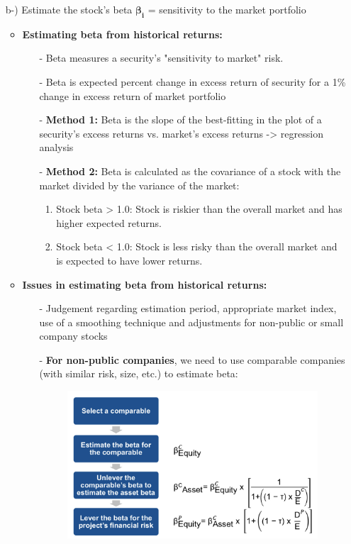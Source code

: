 \documentclass[ieeetran]{article}
\begin{document}
\begin{itemize}
\begin{itemize}
\begin{itemize}
			\item[b-)] Estimate the stock's beta $\boldsymbol{\beta_i}$ = sensitivity to the market portfolio
				\begin{itemize}
					\item \textbf{Estimating beta from historical returns:}
						\begin{enumerate}
							\item[-] Beta measures a security's "sensitivity to market" risk.
							\item[-] Beta is expected percent change in excess return of security for a 1\% change in excess return of market portfolio
							\item[-] \textbf{Method 1:} Beta is the slope of the best-fitting in the plot of a security's excess returns vs. market's excess returns -> regression analysis
							\item[-] \textbf{Method 2:} Beta is calculated as the covariance of a stock with the market divided by the variance of the market:
								\begin{enumerate}
									\item Stock beta > 1.0: Stock is riskier than the overall market and has higher expected returns.
									\item Stock beta < 1.0: Stock is less risky than the overall market and is expected to have lower returns.
								\end{enumerate}
						\end{enumerate}

					\item \textbf{Issues in estimating beta from historical returns:}
						\begin{enumerate}
							\item[-] Judgement regarding estimation period, appropriate market index, use of a smoothing technique and adjustments for non-public or small company stocks
							\item[-] \textbf{For non-public companies}, we need to use comparable companies (with similar risk, size, etc.) to estimate beta: 
		\begin{figure}[h!]
		  \centering
		  \includegraphics[width=0.6\linewidth]{estimatingbeta.jpg}
		  \label{fig:estimatingbeta_jpg}
		\end{figure}						
						\end{enumerate}
				\end{itemize}
		\end{itemize}
	\end{itemize}
\end{itemize}
\end{document}
